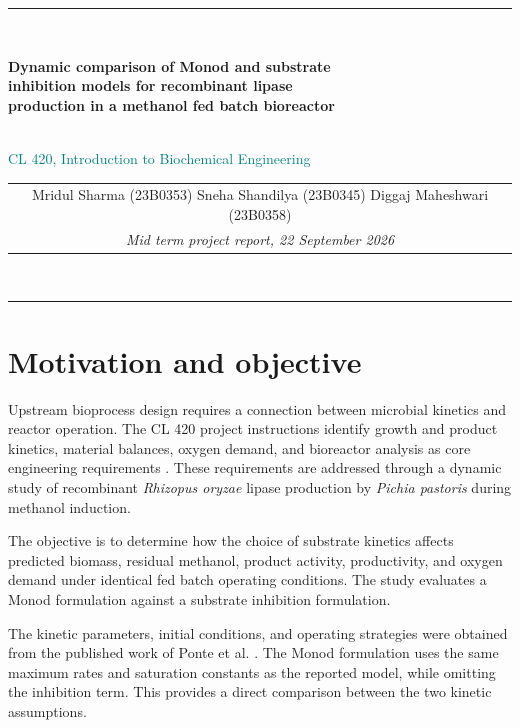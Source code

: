 \documentclass[10pt,a4paper]{article}
\newcommand{\Ppastoris}{\textit{Pichia pastoris}}
\newcommand{\Rlipase}{\textit{Rhizopus oryzae} lipase}
\begin{document}
\begin{center}
  {\color{teal}\rule{\textwidth}{1.2pt}}\\[5pt]
  \begin{minipage}{0.98\textwidth}
    \centering
    {\fontsize{15.5}{20}\selectfont\bfseries\color{ink}
    Dynamic comparison of Monod and substrate\\[5pt]
    inhibition models for recombinant lipase\\[5pt]
    production in a methanol fed batch bioreactor\par}
  \end{minipage}\\[7pt]
  {\large\textcolor{teal}{CL 420, Introduction to Biochemical Engineering}}\\[5pt]
  \begin{tabular}{c}
    Mridul Sharma (23B0353) \quad Sneha Shandilya (23B0345) \quad Diggaj Maheshwari (23B0358)\\
    \textit{Mid term project report, 22 September 2026}
  \end{tabular}\\[5pt]
  {\color{teal}\rule{\textwidth}{0.45pt}}
\end{center}

\section{Motivation and objective}

Upstream bioprocess design requires a connection between microbial kinetics and reactor operation. The CL 420 project instructions identify growth and product kinetics, material balances, oxygen demand, and bioreactor analysis as core engineering requirements \cite{IITBProject,IITBKickoff}. These requirements are addressed through a dynamic study of recombinant \Rlipase{} production by \Ppastoris{} during methanol induction.

The objective is to determine how the choice of substrate kinetics affects predicted biomass, residual methanol, product activity, productivity, and oxygen demand under identical fed batch operating conditions. The study evaluates a Monod formulation against a substrate inhibition formulation.

The kinetic parameters, initial conditions, and operating strategies were obtained from the published work of Ponte et al. \cite{Ponte2018,PonteThesis}. The Monod formulation uses the same maximum rates and saturation constants as the reported model, while omitting the inhibition term. This provides a direct comparison between the two kinetic assumptions.
\end{document}
